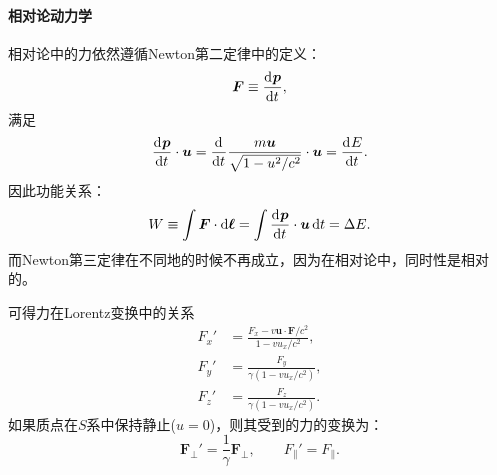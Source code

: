 \paragraph{相对论动力学}

相对论中的力依然遵循Newton第二定律中的定义：
\[
    \bm F\equiv\frac{\mathrm{d}^{{}}\bm p}{\mathrm{d}{t}^{{}}},
\]
满足
\begin{equation}
    \frac{\mathrm{d}^{{}}\bm p}{\mathrm{d}{t}^{{}}}\cdot\bm u=\frac{\mathrm{d}^{{}}}{\mathrm{d}{t}^{{}}}\frac{m\bm u}{\sqrt{1-u^2/c^2}}\cdot\bm u=\frac{\mathrm{d}^{{}}E}{\mathrm{d}{t}^{{}}}.
\end{equation}
因此功能关系：
\begin{equation}
    W\equiv\int\bm F\cdot\mathop{}\!\mathrm{d}\bm\ell=\int\frac{\mathrm{d}^{{}}\bm p}{\mathrm{d}{t}^{{}}}\cdot\bm u\mathop{}\!\mathrm{d} t=\Delta E.
\end{equation}
而Newton第三定律在不同地的时候不再成立，因为在相对论中，同时性是相对的。

可得力在Lorentz变换中的关系
\begin{subequations}
    \begin{align}
        F_x'&=\frac{F_x-v\bm u\cdot\bm F/c^2}{1-vu_x/c^2},\\
        F_y'&=\frac{F_y}{\gamma(1-vu_x/c^2)},\\
        F_z'&=\frac{F_z}{\gamma(1-vu_x/c^2)}.
    \end{align}
\end{subequations}
如果质点在$S$系中保持静止($u=0$)，则其受到的力的变换为：
\begin{equation}
    \bm F_\perp'=\frac1\gamma\bm F_\perp,\qquad F_\parallel'=F_\parallel.
\end{equation}
